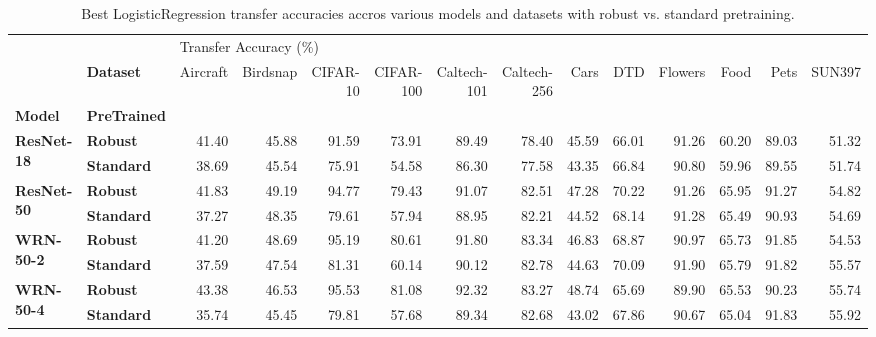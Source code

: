 \begin{table}
\centering
\caption{Best LogisticRegression transfer accuracies accros various models and datasets with robust vs. standard pretraining.}
\label{table:headline-table-LogisticRegression}
\begin{tabular}{llrrrrrrrrrrrr}
\toprule
         & {} & \multicolumn{12}{l}{Transfer Accuracy (\%)} \\
         & \textbf{Dataset} &              Aircraft & Birdsnap & CIFAR-10 & CIFAR-100 & Caltech-101 & Caltech-256 &  Cars &   DTD & Flowers &  Food &  Pets & SUN397 \\
\textbf{Model} & \textbf{PreTrained} &                       &          &          &           &             &             &       &       &         &       &       &        \\
\midrule
\multirow{2}{*}{\textbf{ResNet-18}} & \textbf{Robust} &                 41.40 &    45.88 &    91.59 &     73.91 &       89.49 &       78.40 & 45.59 & 66.01 &   91.26 & 60.20 & 89.03 &  51.32 \\
         & \textbf{Standard} &                 38.69 &    45.54 &    75.91 &     54.58 &       86.30 &       77.58 & 43.35 & 66.84 &   90.80 & 59.96 & 89.55 &  51.74 \\
\cline{1-14}
\multirow{2}{*}{\textbf{ResNet-50}} & \textbf{Robust} &                 41.83 &    49.19 &    94.77 &     79.43 &       91.07 &       82.51 & 47.28 & 70.22 &   91.26 & 65.95 & 91.27 &  54.82 \\
         & \textbf{Standard} &                 37.27 &    48.35 &    79.61 &     57.94 &       88.95 &       82.21 & 44.52 & 68.14 &   91.28 & 65.49 & 90.93 &  54.69 \\
\cline{1-14}
\multirow{2}{*}{\textbf{WRN-50-2}} & \textbf{Robust} &                 41.20 &    48.69 &    95.19 &     80.61 &       91.80 &       83.34 & 46.83 & 68.87 &   90.97 & 65.73 & 91.85 &  54.53 \\
         & \textbf{Standard} &                 37.59 &    47.54 &    81.31 &     60.14 &       90.12 &       82.78 & 44.63 & 70.09 &   91.90 & 65.79 & 91.82 &  55.57 \\
\cline{1-14}
\multirow{2}{*}{\textbf{WRN-50-4}} & \textbf{Robust} &                 43.38 &    46.53 &    95.53 &     81.08 &       92.32 &       83.27 & 48.74 & 65.69 &   89.90 & 65.53 & 90.23 &  55.74 \\
         & \textbf{Standard} &                 35.74 &    45.45 &    79.81 &     57.68 &       89.34 &       82.68 & 43.02 & 67.86 &   90.67 & 65.04 & 91.83 &  55.92 \\
\bottomrule
\end{tabular}
\end{table}
